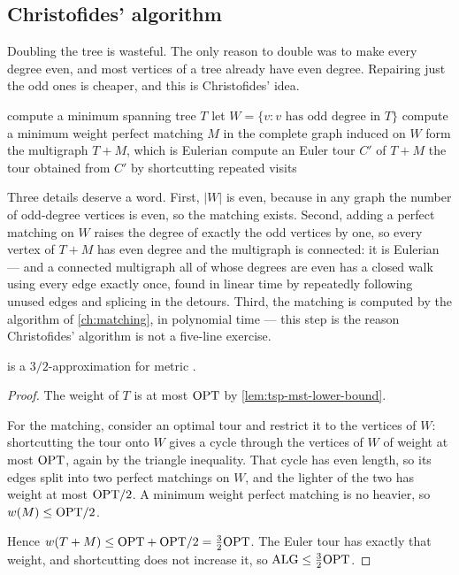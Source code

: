 \subsection{Christofides' algorithm}

Doubling the tree is wasteful. The only reason to double was to make every
degree even, and most vertices of a tree already have even degree. Repairing
just the odd ones is cheaper, and this is Christofides' idea.

\begin{algorithm}[ht]
\caption{Christofides' $3/2$-approximation for metric }
\label{alg:christofides}
\begin{algorithmic}[1]
  \State compute a minimum spanning tree $T$
  \State let $W = \{v : v \text{ has odd degree in } T\}$
  \State compute a minimum weight perfect matching $M$ in the complete graph
         induced on $W$
  \State form the multigraph $T + M$, which is Eulerian
  \State compute an Euler tour $C'$ of $T + M$
  \State \Return the tour obtained from $C'$ by shortcutting repeated visits
\end{algorithmic}
\end{algorithm}

Three details deserve a word. First, $|W|$ is even, because in any graph the
number of odd-degree vertices is even, so the matching exists. Second, adding a
perfect matching on $W$ raises the degree of exactly the odd vertices by one, so
every vertex of $T+M$ has even degree and the multigraph is connected: it is
Eulerian --- and a connected multigraph all of whose degrees are even has a
closed walk using every edge exactly once, found in linear time by repeatedly
following unused edges and splicing in the detours. Third, the
matching is computed by the algorithm of \cref{ch:matching}, in polynomial
time --- this step is the reason Christofides' algorithm is not a five-line
exercise.

\begin{theorem}\label{thm:christofides}
 is a $3/2$-approximation for metric .
\end{theorem}

\begin{proof}
The weight of $T$ is at most $\mathrm{OPT}$ by \cref{lem:tsp-mst-lower-bound}.

For the matching, consider an optimal tour and restrict it to the vertices of
$W$: shortcutting the tour onto $W$ gives a cycle through the vertices of $W$
of weight at most $\mathrm{OPT}$, again by the triangle inequality. That cycle has even
length, so its edges split into two perfect matchings on $W$, and the lighter of
the two has weight at most $\mathrm{OPT}/2$. A minimum weight perfect matching is no
heavier, so $w(M) \le \mathrm{OPT}/2$.

Hence $w(T+M) \le \mathrm{OPT} + \mathrm{OPT}/2 = \tfrac32 \mathrm{OPT}$. The Euler tour has exactly
that weight, and shortcutting does not increase it, so
$\mathrm{ALG} \le \tfrac32\mathrm{OPT}$.
\end{proof}

